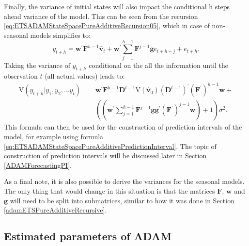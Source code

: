 \documentclass[
]{book}
\theoremstyle{definition}
\theoremstyle{definition}
\theoremstyle{definition}
\theoremstyle{definition}
\theoremstyle{remark}
\begin{document}
Finally, the variance of initial states will also impact the conditional h steps ahead variance of the model. This can be seen from the recursion \eqref{eq:ETSADAMStateSpacePureAdditiveRecursion05}, which in case of non-seasonal models simplifies to:
\begin{equation}
    y_{t+h} = \mathbf{w}^\prime \mathbf{F}^{h-1} \hat{\mathbf{v}}_{t} + \mathbf{w}^\prime \sum_{j=1}^{h-1} \mathbf{F}^{j-1} \mathbf{g} e_{t+h-j} + e_{t+h} .
  \label{eq:ETSADAMStateSpacePureAdditiveForecastVariance01}
\end{equation}
Taking the variance of \(y_{t+h}\) conditional on the all the information until the observation \(t\) (all actual values) leads to:
\begin{equation}
    \begin{aligned}
    \mathrm{V}( y_{t+h} | y_1, y_2, \dots y_t) = & \mathbf{w}^\prime \mathbf{F}^{h-1} \mathbf{D}^{t-1} \mathrm{V}\left( \hat{\mathbf{v}}_{0} \right) \left(\mathbf{D}^{t-1}\right)^\prime (\mathbf{F}^\prime)^{h-1} \mathbf{w} + \\
                                                 & \left( \left(\mathbf{w}^\prime \sum_{j=1}^{h-1} \mathbf{F}^{j-1} \mathbf{g} \mathbf{g}^\prime (\mathbf{F}^\prime)^{j-1} \mathbf{w} \right) + 1 \right) \sigma^2 .
    \end{aligned}
  \label{eq:ETSADAMStateSpacePureAdditiveForecastVariance02}
\end{equation}
This formula can then be used for the construction of prediction intervals of the model, for example using formula \eqref{eq:ETSADAMStateSpacePureAdditivePredictionInterval}. The topic of construction of prediction intervals will be discussed later in Section \ref{ADAMForecastingPI}.

As a final note, it is also possible to derive the variances for the seasonal models. The only thing that would change in this situation is that the matrices \(\mathbf{F}\), \(\mathbf{w}\) and \(\mathbf{g}\) will need to be split into submatrices, similar to how it was done in Section \ref{adamETSPureAdditiveRecursive}.

\hypertarget{estimated-parameters-of-adam}{%
\subsection{Estimated parameters of ADAM}\label{estimated-parameters-of-adam}}
\end{document}
